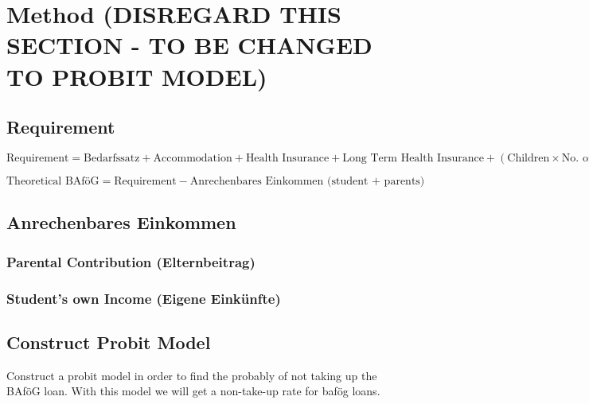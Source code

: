 \section{Method (DISREGARD THIS SECTION - TO BE CHANGED TO PROBIT MODEL)} 

\subsection{Requirement}
\begin{equation}
  \text{Requirement} = \text{Bedarfssatz} + \text{Accommodation} + \text{Health Insurance} + \text{Long Term Health Insurance} + (\text{Children} \times \text{No. of Children} )
\end{equation}

\begin{equation}
  \text{Theoretical BAföG} = \text{Requirement} - \text{Anrechenbares Einkommen (student + parents)}
\end{equation}

\subsection{Anrechenbares Einkommen}
\subsubsection{Parental Contribution (Elternbeitrag)}
\subsubsection{Student's own Income (Eigene Einkünfte)}


\subsection{Construct Probit Model}
Construct a probit model in order to find the probably of not taking up the BAföG loan. 
With this model we will get a non-take-up rate for bafög loans.






